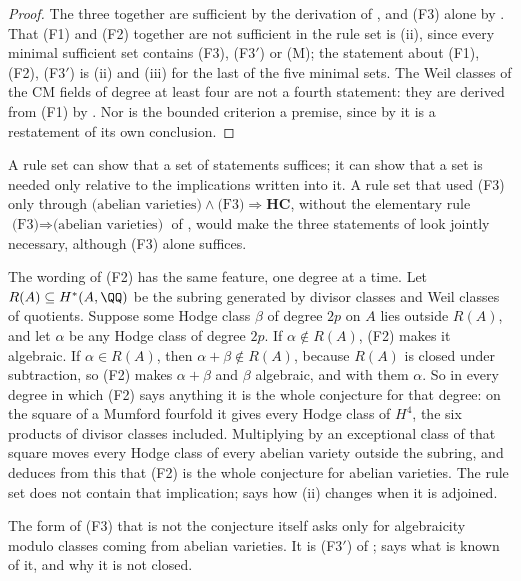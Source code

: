\begin{proof}
The three together are sufficient by the derivation of ,
and (F3) alone by . That (F1) and (F2) together are not
sufficient in the rule set is (ii), since every minimal
sufficient set contains (F3), \textup{(F3$'$)} or \textup{(M)}; the
statement about (F1), (F2), \textup{(F3$'$)} is (ii) and
(iii) for the last of the five minimal sets. The Weil classes of the CM
fields of degree at least four are not a fourth statement: they are derived
from (F1) by \cite[Theorem~17.7]{paperI}. Nor is the bounded criterion a
premise, since by \cite[Theorem~16.17]{paperI} it is a restatement of its own
conclusion.
\end{proof}

\begin{remark}
\label{rem:f3collapse}
A rule set can show that a set of statements suffices; it can show that a set
is needed only relative to the implications written into it. A rule set that
used (F3) only through $\text{(abelian varieties)}\wedge
\text{(F3)}\Rightarrow\mathbf{HC}$, without the elementary rule
$\text{(F3)}\Rightarrow\text{(abelian varieties)}$ of ,
would make the three statements of  look jointly
necessary, although (F3) alone suffices.

The wording of (F2) has the same feature, one degree at a time. Let
$R(A)\subseteq H^{*}(A,\QQ)$ be the subring generated by divisor classes and
Weil classes of quotients. Suppose some Hodge class $\beta$ of degree $2p$ on
$A$ lies outside $R(A)$, and let $\alpha$ be any Hodge class of degree $2p$.
If $\alpha\notin R(A)$, (F2) makes it algebraic. If $\alpha\in R(A)$, then
$\alpha+\beta\notin R(A)$, because $R(A)$ is closed under subtraction, so
(F2) makes $\alpha+\beta$ and $\beta$ algebraic, and with them $\alpha$.
So in every degree in which (F2) says anything it is the whole conjecture for
that degree: on the square of a Mumford fourfold it gives every Hodge class of
$H^{4}$, the six products of divisor classes included. Multiplying by an
exceptional class of that square moves every Hodge class of every abelian
variety outside the subring, and  deduces from this that
(F2) is the whole conjecture for abelian varieties. The rule set does not
contain that implication;  says how (ii)
changes when it is adjoined.

The form of (F3) that is not the conjecture itself asks only for
algebraicity modulo classes coming from abelian varieties. It is
\textup{(F3$'$)} of ;  says what is
known of it, and  why it is not closed.
\end{remark}

